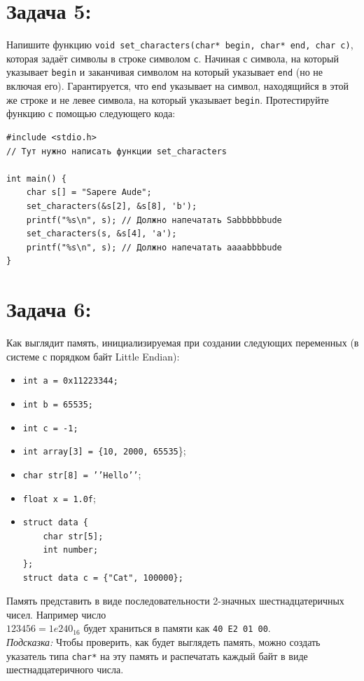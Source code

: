 \documentclass{article}
\begin{document}
\newpage
\section*{Задача 5:}
Напишите функцию \texttt{void set\_characters(char* begin, char* end, char c)}, которая задаёт символы в строке символом \texttt{c}. Начиная с символа, на который указывает \texttt{begin} и заканчивая символом на который указывает \texttt{end} (но не включая его). Гарантируется, что \texttt{end} указывает на символ, находящийся в этой же строке и не левее символа, на который указывает \texttt{begin}. Протестируйте функцию с помощью следующего кода:
\begin{lstlisting}
#include <stdio.h>
// Тут нужно написать функции set_characters

int main() {
    char s[] = "Sapere Aude";
    set_characters(&s[2], &s[8], 'b');
    printf("%s\n", s); // Должно напечатать Sabbbbbbude
    set_characters(s, &s[4], 'a');
    printf("%s\n", s); // Должно напечатать aaaabbbbude
}
\end{lstlisting}


\section*{Задача 6:}
Как выглядит память, инициализируемая при создании следующих переменных (в системе с порядком байт Little Endian):
\begin{multicols}{2}
\begin{itemize}
\item \texttt{int a = 0x11223344;}
\item \texttt{int b = 65535;}
\item \texttt{int c = -1;}
\item \texttt{int array[3] = \{10, 2000, 65535}\};
\item \texttt{char str[8] = '{}'Hello'{}'};
\item \texttt{float x = 1.0f};
\item
\begin{verbatim}
struct data {
    char str[5];
    int number;
};
struct data c = {"Cat", 100000};
\end{verbatim}
\end{itemize}
\end{multicols}
Память представить в виде последовательности 2-значных шестнадцатеричных чисел. Например число \\
$123456 = 1e240_{16}$ будет храниться в памяти как \texttt{40 E2 01 00}. \\

\textit{Подсказка:} Чтобы проверить, как будет выглядеть память, можно создать указатель типа \texttt{char*} на эту память и распечатать каждый байт в виде шестнадцатеричного числа.
\end{document}
